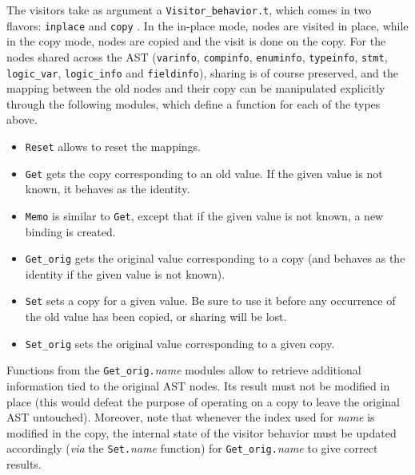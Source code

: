 The visitors take as argument a
\verb+Visitor_behavior.t+, which comes in two
flavors: \verb+inplace+%
 and \verb+copy+%
. In the in-place mode,
nodes are visited in place, while in the copy mode, nodes are copied and the
visit is done on the copy. For the nodes
shared across the AST
(\verb+varinfo+,
\verb+compinfo+,
\verb+enuminfo+,
\verb+typeinfo+,
\verb+stmt+,
\verb+logic_var+,
\verb+logic_info+ and
\verb+fieldinfo+), sharing is of course
preserved, and the mapping between the old nodes and their copy can be
manipulated explicitly through the following modules, which define a function
for each of the types above.
\begin{itemize}
\item
  \verb+Reset+
  allows to reset the mappings.
\item \verb+Get+ gets the copy
  corresponding to an old value. If the given value is not known, it behaves as
  the identity.
\item \verb+Memo+ is similar to
  \verb+Get+, except that if the given value is not known, a new binding is
  created.
\item \verb+Get_orig+
  gets the original value corresponding to a copy (and behaves as the identity
  if the given value is not known).
\item \verb+Set+ sets a copy for a
  given value. Be sure to use it before any occurrence of the old value has
  been copied, or sharing will be lost.
\item \verb+Set_orig+ sets the original
  value corresponding to a given copy.
\end{itemize}

\begin{important}
  Functions from the \verb+Get_orig.+\emph{name} modules allow to retrieve additional
  information tied to the original AST nodes. Its result must not be modified
  in place (this would defeat the purpose of operating
  on a copy to leave the original AST untouched). Moreover, note that whenever
  the index used for \emph{name} is modified in the copy, the internal state of
  the visitor behavior must be updated accordingly
  (\emph{via} the \verb+Set.+\emph{name} function) for
  \verb+Get_orig.+\emph{name} to give correct results.
\end{important}

